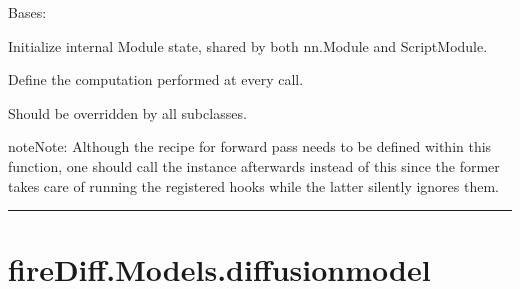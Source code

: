 \documentclass[a4paper,10pt,english]{sphinxmanual}
\begin{document}
\begin{fulllineitems}
\label{\detokenize{models:fireDiff.Models.unet_predictor.PredictorUNet}}
\pysigstartsignatures
{}
\pysigstopsignatures
\sphinxAtStartPar
Bases: 

\sphinxAtStartPar
Initialize internal Module state, shared by both nn.Module and ScriptModule.

\begin{fulllineitems}
\label{\detokenize{models:fireDiff.Models.unet_predictor.PredictorUNet.forward}}
\pysigstartsignatures
{}
\pysigstopsignatures
\sphinxAtStartPar
Define the computation performed at every call.

\sphinxAtStartPar
Should be overridden by all subclasses.

\begin{sphinxadmonition}{note}{Note:}
\sphinxAtStartPar
Although the recipe for forward pass needs to be defined within
this function, one should call the  instance afterwards
instead of this since the former takes care of running the
registered hooks while the latter silently ignores them.
\end{sphinxadmonition}

\end{fulllineitems}


\end{fulllineitems}



\bigskip\hrule\bigskip



\section{fireDiff.Models.diffusionmodel}
\label{\detokenize{models:module-fireDiff.Models.diffusionmodel}}\label{\detokenize{models:firediff-models-diffusionmodel}}
\end{document}
